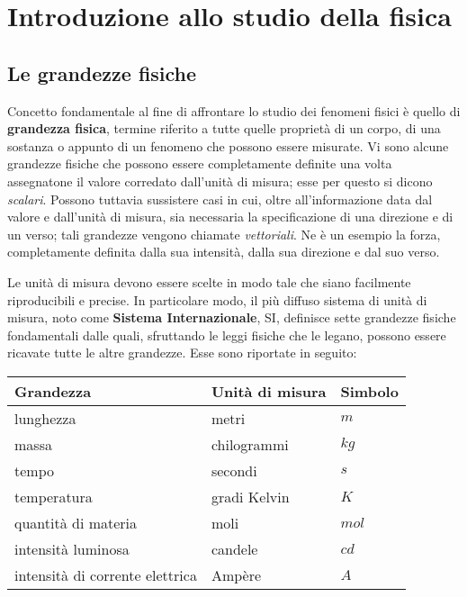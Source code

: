 \chapter{Introduzione allo studio della fisica}

\section{Le grandezze fisiche}

Concetto fondamentale al fine di affrontare lo studio dei fenomeni fisici è quello di \textbf{grandezza fisica}, termine riferito a tutte quelle proprietà di un corpo, di una sostanza o appunto di un fenomeno che possono essere misurate.
Vi sono alcune grandezze fisiche che possono essere completamente definite una volta assegnatone il valore corredato dall'unità di misura; esse per questo si dicono \emph{scalari}. Possono tuttavia sussistere casi in cui, oltre all'informazione data dal valore e dall'unità di misura, sia necessaria la specificazione di una direzione e di un verso; tali grandezze vengono chiamate \emph{vettoriali}. Ne è un esempio la forza, completamente definita dalla sua intensità, dalla sua direzione e dal suo verso.

Le unità di misura devono essere scelte in modo tale che siano facilmente riproducibili e precise. In particolare modo, il più diffuso sistema di unità di misura, noto come \textbf{Sistema Internazionale}, SI, definisce sette grandezze fisiche fondamentali dalle quali, sfruttando le leggi fisiche che le legano, possono essere ricavate tutte le altre grandezze. Esse sono riportate in seguito:

\begin{center}
	\begin{tabular}{lll}
	\toprule
	Grandezza & Unità di misura &Simbolo \\
	\midrule
	lunghezza & metri & $m$ \\
	massa  & chilogrammi & $kg$ \\
	tempo & secondi  & $s$\\
	temperatura &gradi Kelvin & $K$\\
	quantità di materia &moli  & $mol$\\
	intensità luminosa  &candele& $cd$ \\
	intensità di corrente elettrica  &Ampère & $A$ \\
	\bottomrule
	\end{tabular}
\end{center}

